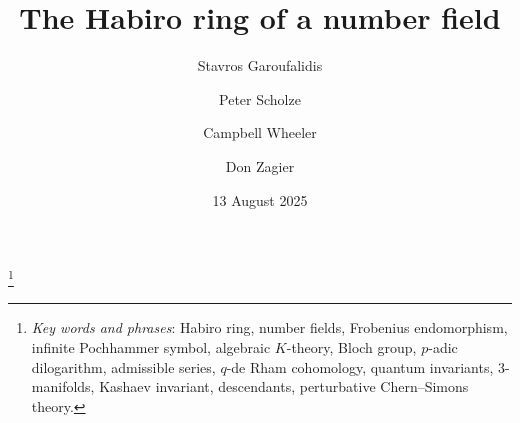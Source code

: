 \documentclass[12pt,reqno]{amsart}
\theoremstyle{definition}
\begin{document}
\title[The Habiro ring of a number field]{
       The Habiro ring of a number field}
\author{Stavros Garoufalidis}
\address{%
  International Center for Mathematics, Department of Mathematics \\
  Southern University of Science and Technology \\
  Shenzhen, China \newline
  {\tt \url{http://people.mpim-bonn.mpg.de/stavros}}}
\author{Peter Scholze}
\address{Max Planck Institute for Mathematics \\
         Bonn, Germany \newline
         {\tt \url{http://people.mpim-bonn.mpg.de/scholze}}}
\author{Campbell Wheeler}
\address{Institut des Hautes \'Etudes Scientifiques \\
         Le Bois-Marie, Bures-sur-Yvette, France 
         \newline
         {\tt \url{https://www.ihes.fr/~wheeler}}}

\author{Don Zagier}
\address{Max Planck Institute for Mathematics \\
        Bonn, Germany
\newline
\indent $\mathrm{and}$ International Centre for Theoretical Physics, Trieste, Italy
\newline 
         {\tt \url{http://people.mpim-bonn.mpg.de/zagier}}}

\thanks{
  {\em Key words and phrases}: Habiro ring, number fields, Frobenius endomorphism,
  infinite Pochhammer symbol, algebraic $K$-theory,
  Bloch group, $p$-adic dilogarithm, admissible series, $q$-de Rham cohomology,
  quantum invariants, \hbox{3-manifolds}, Kashaev invariant, descendants, perturbative
  Chern--Simons theory.
}

\date{13 August 2025}%
\end{document}
